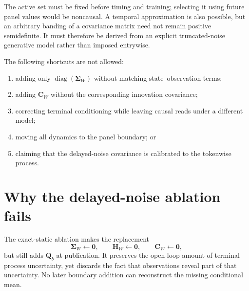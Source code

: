 \documentclass[11pt]{article}
\newcommand{\ve}[1]{\boldsymbol{#1}}
\DeclareMathOperator{\diag}{diag}
\begin{document}
The active set must be fixed before timing and training; selecting it using future panel values
would be noncausal.  A temporal approximation is also possible, but an arbitrary banding of a
covariance matrix need not remain positive semidefinite.  It must therefore be derived from an
explicit truncated-noise generative model rather than imposed entrywise.

The following shortcuts are not allowed:
\begin{enumerate}[leftmargin=1.8em,itemsep=2pt]
  \item adding only $\diag(\ve{\Sigma}_W)$ without matching state--observation terms;
  \item adding $\ve{C}_W$ without the corresponding innovation covariance;
  \item correcting terminal conditioning while leaving causal reads under a different model;
  \item moving all dynamics to the panel boundary; or
  \item claiming that the delayed-noise covariance is calibrated to the tokenwise process.
\end{enumerate}

\section{Why the delayed-noise ablation fails}

The exact-static ablation makes the replacement
\begin{equation}
  \ve{\Sigma}_W\leftarrow\ve{0},
  \qquad
  \ve{H}_W\leftarrow\ve{0},
  \qquad
  \ve{C}_W\leftarrow\ve{0},
  \label{eq:delayed-noise}
\end{equation}
but still adds $\ve{Q}_b$ at publication.  It preserves the open-loop amount of terminal process
uncertainty, yet discards the fact that observations reveal part of that uncertainty.  No later
boundary addition can reconstruct the missing conditional mean.
\end{document}
